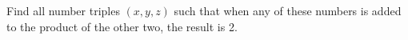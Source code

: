 Find all number triples $(x,y,z)$ such that when any of these numbers is added to the product of the other two, the result is 2.